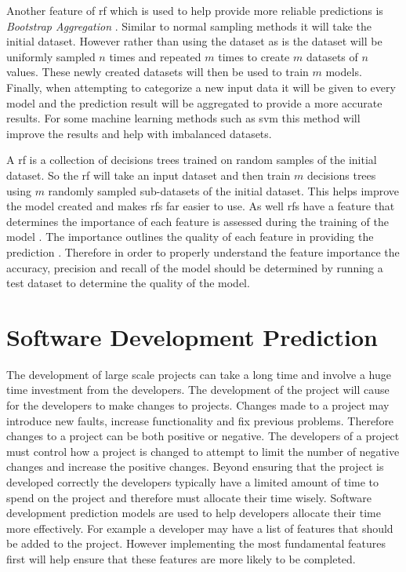 Another feature of \gls{rf} which is used to help provide more reliable predictions is \textit{Bootstrap Aggregation} \cite{Westland2011}. Similar to normal sampling methods it will take the initial dataset. However rather than using the dataset as is the dataset will be uniformly sampled $n$ times and repeated $m$ times to create $m$ datasets of $n$ values. These newly created datasets will then be used to train $m$ models. Finally, when attempting to categorize a new input data it will be given to every model and the prediction result will be aggregated to provide a more accurate results. For some machine learning methods such as \gls{svm} this method will improve the results and help with imbalanced datasets.

A \gls{rf} is a collection of decisions trees trained on random samples of the initial dataset. So the \gls{rf} will take an input dataset and then train $m$ decisions trees using $m$ randomly sampled sub-datasets of the initial dataset. This helps improve the model created and makes \gls{rf}s far easier to use. As well \gls{rf}s have a feature that determines the importance of each feature is assessed during the training of the model \cite{Westland2011}. The importance outlines the quality of each feature in providing the prediction \cite{Verikas2011}. Therefore in order to properly understand the feature importance the accuracy, precision and recall of the model should be determined by running a test dataset to determine the quality of the model.

\section{Software Development Prediction}

The development of large scale projects can take a long time and involve a huge time investment from the developers. The development of the project will cause for the developers to make changes to projects. Changes made to a project may introduce new faults, increase functionality and fix previous problems. Therefore changes to a project can be both positive or negative. The developers of a project must control how a project is changed to attempt to limit the number of negative changes and increase the positive changes. Beyond ensuring that the project is developed correctly the developers typically have a limited amount of time to spend on the project and therefore must allocate their time wisely. Software development prediction models are used to help developers allocate their time more effectively. For example a developer may have a list of features that should be added to the project. However implementing the most fundamental features first will help ensure that these features are more likely to be completed.

